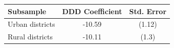 \begin{tabular}{lcc}
\toprule
\textbf{Subsample} & \textbf{DDD Coefficient} & \textbf{Std. Error} \\
\midrule
Urban districts & -10.59 & (1.12) \\
Rural districts & -10.11 & (1.3) \\
\bottomrule
\end{tabular}

